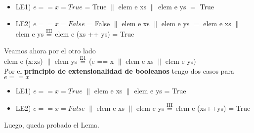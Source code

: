 \documentclass{article}
\begin{document}
\begin{itemize}
    \item LE1) $e==x = True$ = True $\|$ elem e xs $\|$ elem e ys $=$ True
    \item LE2) $e==x = False$ = False $\|$ elem e xs $\|$ elem e ys $=$ elem e xs $\|$ elem e ys $\stackrel{\text{HI}}{=}$ elem e (xs ++ ys) = True 
\end{itemize}
Veamos ahora por el otro lado \\
elem e (x:xs) $\|$ elem ys $\stackrel{\text{E1}}{=}$ (e == x $\|$ elem e xs $\|$ elem e ys) \\
Por el \textbf{principio de extensionalidad de booleanos} tengo dos casos para $e==x$
\begin{itemize}
    \item LE1) $e==x = True$ $\|$ elem e xs $\|$ elem e ys = True 
    \item LE2) $e==x = False$ $\|$ elem e xs $\|$ elem e ys $\stackrel{\text{HI}}{=}$ elem e (xs++ys) = True 
\end{itemize}
Luego, queda probado el Lema. 
\end{document}
